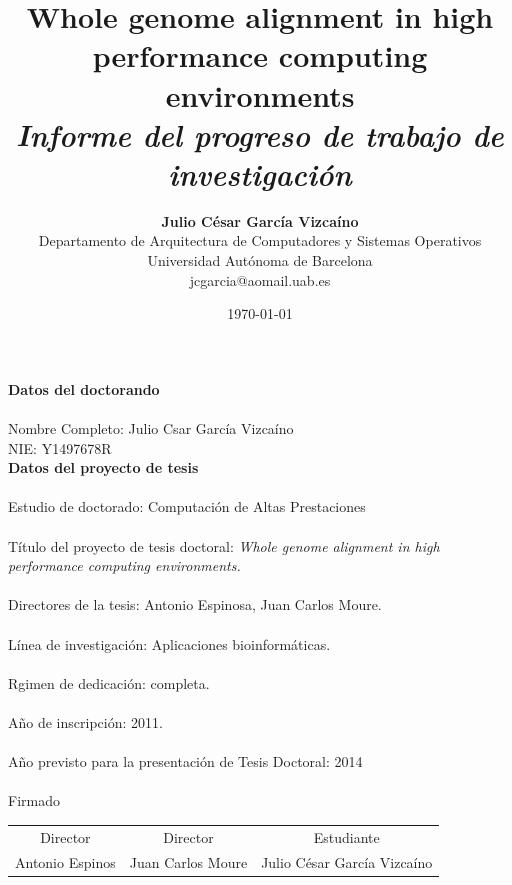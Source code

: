 \documentclass[12pt,a4paper]{article}
\title{ {\bf Whole genome alignment in high performance computing environments} \\
\it Informe del progreso de trabajo de investigaci\'on}
\author{ {\bf Julio C\'esar Garc\'ia Vizca\'ino}  \\ 
Departamento de Arquitectura de Computadores y Sistemas Operativos \\ 
Universidad Aut\'onoma de Barcelona\\ 
{\small jcgarcia@aomail.uab.es} 
}
\date{\today}
\begin{document}
\pagestyle{plain}
\maketitle
\pagebreak
{\Huge{\bf Datos del doctorando}}\\
{\Large \\Nombre Completo: Julio Csar García Vizcaíno\\}
\vspace{0.3cm}
{\Large NIE: Y1497678R\\}
{\Huge{\bf Datos del proyecto de tesis}}\\
\vspace{0.3cm}
{\Large \\Estudio de doctorado: Computación de Altas Prestaciones\\}
\vspace{0.3cm}
{\Large \\Título del proyecto de tesis doctoral: \emph{
Whole genome alignment in high performance computing environments.}\\}
\vspace{0.3cm}
{\Large \\Directores de la tesis: Antonio Espinosa, Juan Carlos Moure.\\}
\vspace{0.3cm}
{\Large \\Línea de investigación: Aplicaciones bioinformáticas.\\}
\vspace{0.3cm}
{\Large \\Rgimen de dedicación: completa.\\}
\vspace{0.3cm}
{\Large \\A\~no de inscripci\'on: 2011.\\}
\vspace{0.3cm}
{\Large \\A\~no previsto para la presentaci\'on de Tesis Doctoral: 2014\\}
\vspace{0.3cm}
{\large \\Firmado\\}
\vspace{2.8cm}
\begin{center}
\begin{tabular}{ c c c }
Director & Director & Estudiante\\
Antonio Espinos & Juan Carlos Moure & Julio C\'esar García Vizcaíno\\
\end{tabular}
\end{center}
\pagebreak
{}
\end{document}
